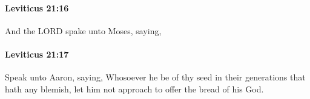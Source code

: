 		\paragraph{Leviticus 21:16} %
			\label{LEVITICUS-21-16}

			And the LORD spake unto Moses, saying,


		\paragraph{Leviticus 21:17} %
			\label{LEVITICUS-21-17}

			Speak unto Aaron, saying, Whosoever he be of thy seed in their generations that hath any blemish, let him not approach to offer the bread of his God.


